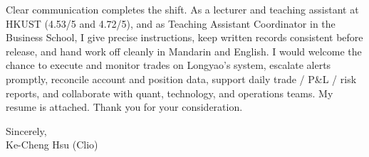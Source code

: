 \documentclass[11pt,letterpaper]{article}
\begin{document}
Clear communication completes the shift. As a lecturer and teaching assistant at HKUST (4.53/5 and 4.72/5), and as Teaching Assistant Coordinator in the Business School, I give precise instructions, keep written records consistent before release, and hand work off cleanly in Mandarin and English. I would welcome the chance to execute and monitor trades on Longyao's system, escalate alerts promptly, reconcile account and position data, support daily trade / P\&L / risk reports, and collaborate with quant, technology, and operations teams. My resume is attached. Thank you for your consideration.

\vspace{0.4em}
Sincerely,\\[0.35em]
Ke-Cheng Hsu (Clio)
\end{document}
